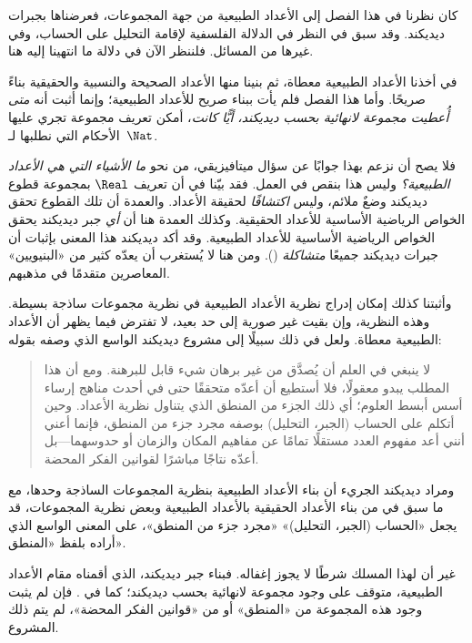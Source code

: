 \documentclass[../../../include/open-logic-section]{subfiles}
\begin{document}


كان نظرنا في هذا الفصل إلى الأعداد الطبيعية من جهة المجموعات، فعرضناها بجبرات ديديكند. وقد سبق في  النظر في الدلالة الفلسفية لإقامة التحليل على الحساب، وفي غيرها من المسائل. فلننظر الآن في دلالة ما انتهينا إليه هنا.

في  أخذنا الأعداد الطبيعية معطاة، ثم بنينا منها الأعداد الصحيحة والنسبية والحقيقية بناءً صريحًا. وأما هذا الفصل فلم يأت ببناء صريح للأعداد الطبيعية؛ وإنما أثبت أنه
\emph{متى أُعطيت مجموعة لانهائية بحسب ديديكند، أيًّا كانت}، أمكن تعريف مجموعة تجري عليها الأحكام التي نطلبها لـ~$\Nat$.

فلا يصح أن نزعم بهذا جوابًا عن سؤال ميتافيزيقي، من نحو
\emph{ما الأشياء التي هي الأعداد الطبيعية؟} وليس هذا بنقص في العمل. فقد بيّنا في
 أن تعريف
$\Real$ بمجموعة قطوع ديديكند وضعٌ ملائم، وليس
\emph{اكتشافًا} لحقيقة الأعداد. والعمدة أن تلك القطوع تحقق الخواص الرياضية الأساسية للأعداد الحقيقية. وكذلك العمدة هنا أن \emph{أي}
جبر ديديكند يحقق الخواص الرياضية الأساسية للأعداد الطبيعية. وقد أكد ديديكند هذا المعنى بإثبات أن جبرات ديديكند جميعًا
\emph{متشاكلة} (\citeyear[المبرهنتان
132--3]{Dedekind1888}). ومن هنا لا يُستغرب أن يعدّه كثير من «البنيويين» المعاصرين متقدمًا في مذهبهم.

وأثبتنا كذلك إمكان إدراج نظرية الأعداد الطبيعية في نظرية مجموعات ساذجة بسيطة. وهذه النظرية، وإن بقيت غير صورية إلى حد بعيد، لا تفترض فيما يظهر أن الأعداد الطبيعية معطاة. ولعل في ذلك سبيلًا إلى مشروع ديديكند الواسع الذي وصفه بقوله:
\begin{quote}
	لا ينبغي في العلم أن يُصدَّق من غير برهان شيء قابل للبرهنة.
	ومع أن هذا المطلب يبدو معقولًا، فلا أستطيع أن أعدّه متحققًا حتى
	في أحدث مناهج إرساء أسس أبسط العلوم؛ أي ذلك الجزء من المنطق الذي
	يتناول نظرية الأعداد. وحين أتكلم على الحساب (الجبر، التحليل)
	بوصفه مجرد جزء من المنطق، فإنما أعني أنني أعد مفهوم العدد مستقلًا
	تمامًا عن مفاهيم المكان والزمان أو حدوسهما---بل أعدّه نتاجًا
	مباشرًا لقوانين الفكر المحضة.
	\citep[المقدمة]{Dedekind1888}
\end{quote}
ومراد ديديكند الجريء أن بناء الأعداد الطبيعية بنظرية المجموعات الساذجة وحدها، مع ما سبق في
 من بناء الأعداد الحقيقية بالأعداد الطبيعية وبعض نظرية المجموعات، قد يجعل «الحساب (الجبر، التحليل)» «مجرد جزء من المنطق»، على المعنى الواسع الذي أراده بلفظ «المنطق».

غير أن لهذا المسلك شرطًا لا يجوز إغفاله. فبناء جبر ديديكند، الذي أقمناه مقام الأعداد الطبيعية، متوقف على وجود مجموعة لانهائية بحسب ديديكند؛ كما في
.
فإن لم يثبت وجود هذه المجموعة من «المنطق» أو من «قوانين الفكر المحضة»، لم يتم ذلك المشروع.
\end{document}
